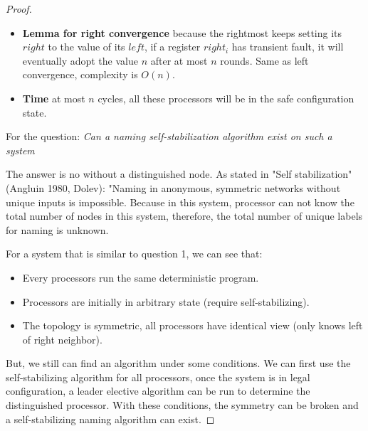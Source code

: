 \documentclass[12pt]{article}
\begin{document}
\begin{proof}
\begin{itemize}
    \item \textbf{Lemma for right convergence} because the rightmost keeps setting its $right$ to the value of its $left$,
    if a register $right_i$ has transient fault, it will eventually adopt the value $n$ after at most $n$ rounds. Same as
    left convergence, complexity is $O(n)$.

    \item \textbf{Time} at most $n$ cycles, all these processors will be in the safe configuration state.
\end{itemize}

For the question: \textit{Can a naming self-stabilization algorithm exist on such a system}

The answer is no without a distinguished node. As stated in "Self stabilization" (Angluin 1980, Dolev): "Naming in anonymous,
symmetric networks without unique inputs is impossible. Because in this system, processor can not know the total number of 
nodes in this system, therefore, the total number of unique labels for naming is unknown.

For a system that is similar to question 1, we can see that:
\begin{itemize}
    \item Every processors run the same deterministic program.
    \item Processors are initially in arbitrary state (require self-stabilizing).
    \item The topology is symmetric, all processors have identical view (only knows left of right neighbor).
\end{itemize}

But, we still can find an algorithm under some conditions. We can first use the self-stabilizing algorithm for
all processors, once the system is in legal configuration, a leader elective algorithm can be run to determine 
the distinguished processor. With these conditions, the symmetry can be broken and a self-stabilizing naming algorithm
can exist.

\end{proof}

\vspace{3in}
\end{document}

